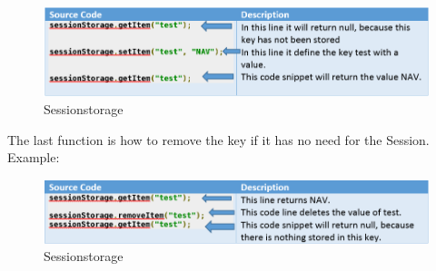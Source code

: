\begin{figure}[htbp]
\centering
\includegraphics[width=0.4\linewidth]{graphics/sessionstorage2.PNG}
\caption{Sessionstorage}
\end{figure}

The last function is how to remove the key if it has no need for the Session. Example:
\begin{figure}[htbp]
\centering
\includegraphics[width=0.4\linewidth]{graphics/sessionstorage3.PNG}
\caption{Sessionstorage}
\end{figure}

